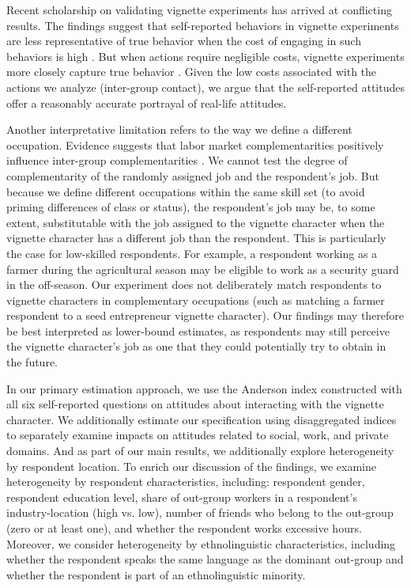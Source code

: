 \documentclass[a4paper,12pt]{article}
\begin{document}
Recent scholarship on validating vignette experiments has arrived at conflicting results. The findings suggest that self-reported behaviors in vignette experiments are less representative of true behavior when the cost of engaging in such behaviors is high \citep{whiting2021validating}. But when actions require negligible costs, vignette experiments more closely capture true behavior \citep{hainmueller2015validating}. Given the low costs associated with the actions we analyze (inter-group contact), we argue that the self-reported attitudes offer a reasonably accurate portrayal of real-life attitudes. 

Another interpretative limitation refers to the way we define a different occupation. Evidence suggests that labor market complementarities  positively influence inter-group complementarities \citep{jha2013}.  We cannot test the degree of complementarity of the randomly assigned job and the respondent's job. But because we define different occupations within the same skill set (to avoid priming differences of class or status), the respondent's job may be, to some extent, substitutable with the job assigned to the vignette character when the vignette character has a different job than the respondent. This is particularly the case for low-skilled respondents. For example, a respondent working as a farmer during the agricultural season may be eligible to work as a security guard in the off-season. Our experiment does not deliberately match respondents to vignette characters in complementary occupations (such as matching a farmer respondent to a seed entrepreneur vignette character). Our findings may therefore be best interpreted as lower-bound estimates, as respondents may still perceive the vignette character's job as one that they could potentially try to obtain in the future. 

In our primary estimation approach, we use the Anderson index constructed with all six self-reported questions on attitudes about interacting with the vignette character. We additionally estimate our specification using disaggregated indices to separately examine impacts on attitudes related to social, work, and private domains. And as part of our main results, we additionally explore heterogeneity by respondent location. To enrich our discussion of the findings, we examine heterogeneity by respondent characteristics, including: respondent gender, respondent education level, share of out-group workers in a respondent's industry-location (high vs. low), number of friends who belong to the out-group (zero or at least one), and whether the respondent works excessive hours. Moreover, we consider heterogeneity by ethnolinguistic characteristics, including whether the respondent speaks the same language as the dominant out-group and whether the respondent is part of an ethnolinguistic minority.
\end{document}
